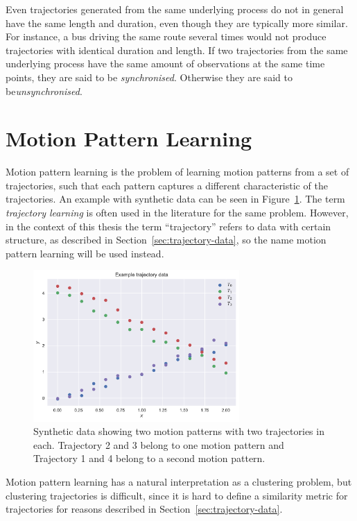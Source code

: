 Even trajectories generated from the same underlying process do not in general
have the same length and duration, even though they are typically more
similar. For instance, a bus driving the same route several times
would not produce trajectories with identical duration and length. 
If two trajectories from the same underlying
process have the same amount of observations at the same time points,
they are said to be \textit{synchronised}. 
Otherwise they are said to be\textit{unsynchronised}.

\section{Motion Pattern Learning}
Motion pattern learning is the problem of learning motion patterns from a
set of trajectories, such that each pattern captures a different
characteristic of the trajectories. An example with synthetic data can be
seen in Figure~\ref{fig:motion-pattern-example}. The term
\textit{trajectory learning} is often used in the literature for the
same problem. However, in the
context of this thesis the term ``trajectory'' refers to data with
certain structure, as described in Section~\ref{sec:trajectory-data}, so 
the name motion pattern learning will be used instead.
\begin{figure}[H]
  \centering
  \includegraphics[width=0.7\textwidth]{figures/motion-pattern-example}
  \caption{Synthetic data showing two motion patterns with two trajectories in
    each. Trajectory 2 and 3 belong to one motion pattern and
    Trajectory 1 and 4 belong to a second motion pattern.}\label{fig:motion-pattern-example}
\end{figure}
Motion pattern learning has a natural interpretation as a
clustering problem, but clustering trajectories is difficult,
since it is hard to define a similarity metric for trajectories for
reasons described in Section~\ref{sec:trajectory-data}.

